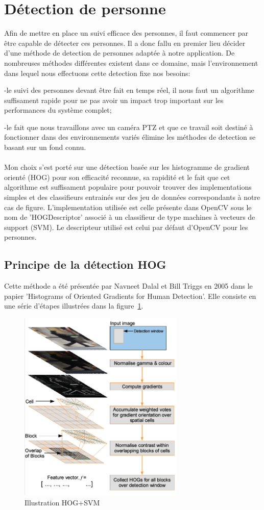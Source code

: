 \documentclass[11pt]{article}
\begin{document}
\section{Détection de personne}
Afin de mettre en place un suivi efficace des personnes, il faut commencer par être capable de détecter ces personnes. Il a donc fallu en premier lieu décider d'une méthode de detection de personnes adaptée à notre application. De nombreuses méthodes différentes existent dans ce domaine, mais l'environnement dans lequel nous effectuons cette detection fixe nos besoins:

-le suivi des personnes devant être fait en temps réel, il nous faut un algorithme suffisament rapide pour ne pas avoir un impact trop important sur les performances du système complet;

-le fait que nous travaillons avec un caméra PTZ et que ce travail soit destiné à fonctionner dans des environnements variés élimine les méthodes de detection se basant sur un fond connu.\\
\\
Mon choix s'est porté sur une détection basée sur les histogramme de gradient orienté (HOG) pour son efficacité reconnue, sa rapidité et le fait que cet algorithme est suffisament populaire pour pouvoir trouver des implementations simples et des classifieurs entrainés sur des jeu de données correspondants à notre cas de figure.
L'implementation utilisée est celle présente dans OpenCV sous le nom de 'HOGDescriptor' associé à un classifieur de type machines à vecteurs de support (SVM). Le descripteur utilisé est celui par défaut d'OpenCV pour les personnes.
\subsection{Principe de la détection HOG}
Cette méthode a été présentée par Navneet Dalal et Bill Triggs en 2005 dans le papier 'Histograms of Oriented Gradients for Human Detection'.
Elle consiste en une série d'étapes illustrées dans la figure~\ref{fig:hog_topo}.
\begin{figure}[!h]
    \label{fig:hog_topo}
    \centering
	    \includegraphics[width=0.7\textwidth]{hog_topo.png}
	    \caption{Illustration HOG+SVM}
\end{figure}
\end{document}
